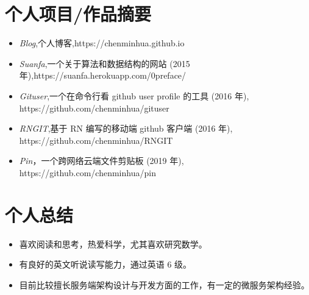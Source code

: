 \documentclass{resume}
\begin{document}
\section{个人项目/作品摘要}
\begin{itemize}[parsep=0.2ex]
  \item \textit{Blog},个人博客,https://chenminhua.github.io
  \item \textit{Suanfa},一个关于算法和数据结构的网站 (2015 年),https://suanfa.herokuapp.com/0preface/
  \item \textit{Gituser},一个在命令行看 github user profile 的工具 (2016 年), https://github.com/chenminhua/gituser
  \item \textit{RNGIT},基于 RN 编写的移动端 github 客户端 (2016 年), https://github.com/chenminhua/RNGIT 
  \item \textit{Pin}，一个跨网络云端文件剪贴板 (2019 年), https://github.com/chenminhua/pin

\end{itemize}

\section{个人总结}
\begin{itemize}[parsep=0.2ex]
  \item 喜欢阅读和思考，热爱科学，尤其喜欢研究数学。
  \item 有良好的英文听说读写能力，通过英语 6 级。 
  \item 目前比较擅长服务端架构设计与开发方面的工作，有一定的微服务架构经验。
\end{itemize}

%
%
\end{document}
